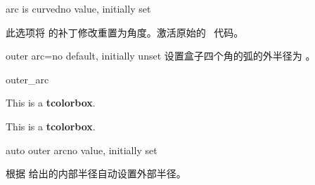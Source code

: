   
  \begin{docTcbKey}[][doc new=2015-05-05]{arc is curved}{}{no value, initially set}
  
  此选项将  的补丁修改重置为角度。激活原始的 \tikzname\ 代码。
  \end{docTcbKey}
  
  
  \begin{docTcbKey}{outer arc}{=}{no default, initially unset}
  设置盒子四个角的弧的外半径为 。
  
  \begin{exdispExample}{outer_arc}
  
  \begin{tcolorbox}[arc=4mm,outer arc=1mm]
  This is a \textbf{tcolorbox}.
  \end{tcolorbox}
  \begin{tcolorbox}[arc=4mm]
    This is a \textbf{tcolorbox}.
  \end{tcolorbox}
  \end{exdispExample}
  \end{docTcbKey}
  
  \begin{docTcbKey}{auto outer arc}{}{no value, initially set}
  
  根据  给出的内部半径自动设置外部半径。
  
  \end{docTcbKey}
  
